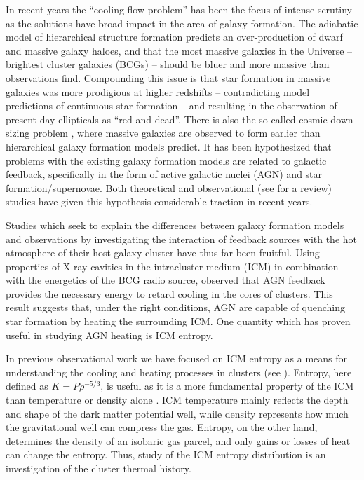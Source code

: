 \documentclass{emulateapj}
\begin{document}
In recent years the ``cooling flow problem'' has been the focus of
intense scrutiny as the solutions have broad impact in the area of
galaxy formation. The adiabatic model of hierarchical structure
formation predicts an over-production of dwarf and massive galaxy
haloes, and that the most massive galaxies in the Universe --
brightest cluster galaxies (BCGs) -- should be bluer and more massive
than observations find. Compounding this issue is that star formation
in massive galaxies was more prodigious at higher redshifts
\citep{1996AJ....112..839C, 2005ApJ...619L.135J} -- contradicting
model predictions of continuous star formation -- and resulting in the
observation of present-day ellipticals as ``red and dead''. There is
also the so-called cosmic down-sizing problem
\citep{1996AJ....112..839C}, where massive galaxies are observed to
form earlier than hierarchical galaxy formation models predict. It has
been hypothesized that problems with the existing galaxy formation
models are related to galactic feedback, specifically in the form of
active galactic nuclei (AGN) and star formation/supernovae. Both
theoretical \citep{bower06, croton06} and observational (see
\citealt{mcnamrev} for a review) studies have given this hypothesis
considerable traction in recent years.

Studies which seek to explain the differences between galaxy formation
models and observations by investigating the interaction of feedback
sources with the hot atmosphere of their host galaxy cluster have thus
far been fruitful. Using properties of X-ray cavities in the
intracluster medium (ICM) in combination with the energetics of the
BCG radio source, \cite{birzan04} observed that AGN feedback provides
the necessary energy to retard cooling in the cores of clusters. This
result suggests that, under the right conditions, AGN are capable of
quenching star formation by heating the surrounding ICM. One quantity
which has proven useful in studying AGN heating is ICM entropy.

In previous observational work we have focused on ICM entropy as a
means for understanding the cooling and heating processes in clusters
(see \citealt{radioquiet, d06, accept}). Entropy, here defined as
$K=P\rho^{-5/3}$, is useful as it is a more fundamental property of
the ICM than temperature or density alone
\citep{voitbryan,voitreview}. ICM temperature mainly reflects the
depth and shape of the dark matter potential well, while density
represents how much the gravitational well can compress the
gas. Entropy, on the other hand, determines the density of an isobaric
gas parcel, and only gains or losses of heat can change the
entropy. Thus, study of the ICM entropy distribution is an
investigation of the cluster thermal history.
\end{document}
